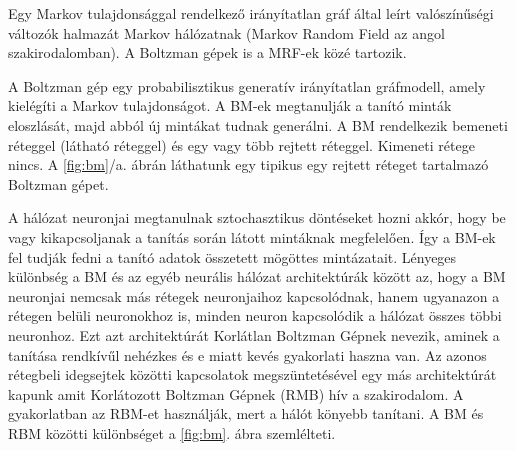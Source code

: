 
Egy Markov tulajdonsággal rendelkező irányítatlan gráf által leírt valószínűségi változók halmazát Markov hálózatnak (Markov Random Field az angol szakirodalomban). A Boltzman gépek is a MRF-ek közé tartozik.

A Boltzman gép egy probabilisztikus generatív irányítatlan gráfmodell, amely kielégíti a Markov tulajdonságot. A BM-ek megtanulják a tanító minták eloszlását, majd abból új mintákat tudnak generálni. A BM rendelkezik bemeneti réteggel (látható réteggel) és egy vagy több rejtett réteggel. Kimeneti rétege nincs. A \ref{fig:bm}/a. ábrán láthatunk egy tipikus egy rejtett réteget tartalmazó Boltzman gépet.





A hálózat neuronjai megtanulnak sztochasztikus döntéseket hozni akkór, hogy be vagy kikapcsoljanak a tanítás során látott mintáknak megfelelően. Így a BM-ek fel tudják fedni a tanító adatok összetett mögöttes mintázatait. Lényeges különbség a BM és az egyéb neurális hálózat architektúrák között az, hogy a BM neuronjai nemcsak más rétegek neuronjaihoz kapcsolódnak, hanem ugyanazon a rétegen belüli neuronokhoz is, minden neuron kapcsolódik a hálózat összes többi neuronhoz. Ezt azt architektúrát Korlátlan Boltzman Gépnek nevezik, aminek a tanítása rendkívűl nehézkes és e miatt kevés gyakorlati haszna van. Az azonos rétegbeli idegsejtek közötti kapcsolatok megszüntetésével egy más architektúrát kapunk amit Korlátozott Boltzman Gépnek (RMB) hív a szakirodalom. A gyakorlatban az RBM-et használják, mert a hálót könyebb tanítani. A BM és RBM közötti különbséget a \ref{fig:bm}. ábra szemlélteti.

